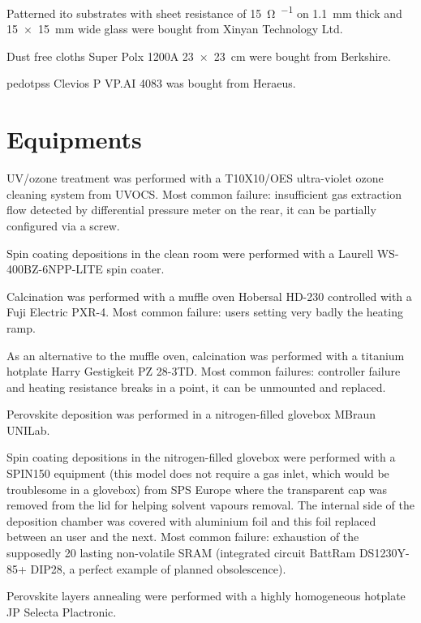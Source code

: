 	Patterned \gls{ito} substrates with sheet resistance of \SI{15}{\ohm\per\sq} on \SI{1.1}{\mm} thick and \SI{15x15}{\mm} wide glass were bought from Xinyan Technology Ltd.

	Dust free cloths Super Polx 1200A \SI{23x23}{\cm} were bought from Berkshire.

	\Gls{pedotpss} Clevios P VP.AI 4083 was bought from Heraeus.
	
\section{Equipments}

	 UV/ozone treatment was performed with a T10X10/OES ultra-violet ozone cleaning system from UVOCS. Most common failure: insufficient gas extraction flow detected by differential pressure meter on the rear, it can be partially configured via a screw.

	 Spin coating depositions in the clean room were performed with a Laurell WS-400BZ-6NPP-LITE spin coater.

	 Calcination was performed with a muffle oven Hobersal HD-230 controlled with a Fuji Electric PXR-4. Most common failure: users setting very badly the heating ramp.
	
	 As an alternative to the muffle oven, calcination was performed with a titanium hotplate Harry Gestigkeit PZ 28-3TD. Most common failures: controller failure and heating resistance breaks in a point, it can be unmounted and replaced.

	 Perovskite deposition was performed in a nitrogen-filled glovebox MBraun UNILab.

	 Spin coating depositions in the nitrogen-filled glovebox were performed with a SPIN150 equipment (this model does not require a gas inlet, which would be troublesome in a glovebox) from SPS Europe where the transparent cap was removed from the lid for helping solvent vapours removal. The internal side of the deposition chamber was covered with aluminium foil and this foil replaced between an user and the next. Most common failure: exhaustion of the supposedly \SI{20}{\year} lasting non-volatile SRAM (integrated circuit BattRam DS1230Y-85+ DIP28, a perfect example of planned obsolescence).

	 Perovskite layers annealing were performed with a highly homogeneous hotplate JP Selecta Plactronic.

